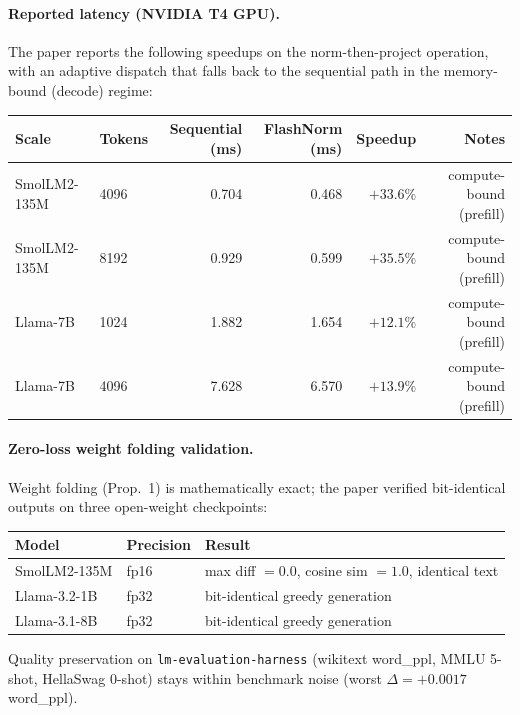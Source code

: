 \paragraph{Reported latency (NVIDIA T4 GPU).}
The paper reports the following speedups on the norm-then-project operation, with an adaptive dispatch that falls back to the sequential path in the memory-bound (decode) regime:

\scriptsize
\begin{tabular}{llrrrr}
\toprule
\textbf{Scale} & \textbf{Tokens} & \textbf{Sequential (ms)} & \textbf{FlashNorm (ms)} & \textbf{Speedup} & \textbf{Notes} \\
\midrule
SmolLM2-135M & 4096 & 0.704 & 0.468 & $+33.6\%$ & compute-bound (prefill) \\
SmolLM2-135M & 8192 & 0.929 & 0.599 & $+35.5\%$ & compute-bound (prefill) \\
Llama-7B     & 1024 & 1.882 & 1.654 & $+12.1\%$ & compute-bound (prefill) \\
Llama-7B     & 4096 & 7.628 & 6.570 & $+13.9\%$ & compute-bound (prefill) \\
\bottomrule
\end{tabular}
\normalsize

\paragraph{Zero-loss weight folding validation.}
Weight folding (Prop.~1) is mathematically exact; the paper verified bit-identical outputs on three open-weight checkpoints:

\scriptsize
\begin{tabular}{lll}
\toprule
\textbf{Model} & \textbf{Precision} & \textbf{Result} \\
\midrule
SmolLM2-135M & fp16 & max diff $=0.0$, cosine sim $=1.0$, identical text \\
Llama-3.2-1B & fp32 & bit-identical greedy generation \\
Llama-3.1-8B & fp32 & bit-identical greedy generation \\
\bottomrule
\end{tabular}
\normalsize
Quality preservation on \texttt{lm-evaluation-harness} (wikitext word\_ppl, MMLU 5-shot, HellaSwag 0-shot) stays within benchmark noise (worst $\Delta=+0.0017$ word\_ppl).


